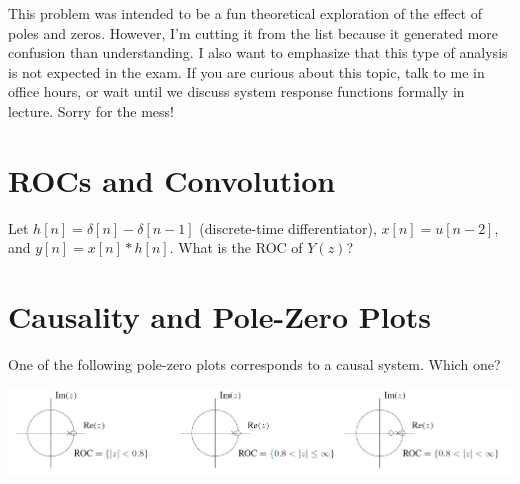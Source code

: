 \documentclass[11pt]{article}
\begin{document}
%
{\color{red}
This problem was intended to be a fun theoretical exploration of the effect of poles and zeros. However, I'm cutting it from the list because it generated more confusion than understanding. I also want to emphasize that this type of analysis is not expected in the exam. If you are curious about this topic, talk to me in office hours, or wait until we discuss system response functions formally in lecture. Sorry for the mess!

}

\section{ROCs and Convolution}

Let $h[n]=\delta[n]-\delta[n-1]$ (discrete-time differentiator), $x[n]=u[n-2]$, and $y[n]=x[n]*h[n]$. What is the ROC of $Y(z)$?

%
%
%

\section{Causality and Pole-Zero Plots}
One of the following pole-zero plots corresponds to a causal system. Which one?

\includegraphics[width=\textwidth]{causal_pole_zero_plots.png} 

%
\end{document}
